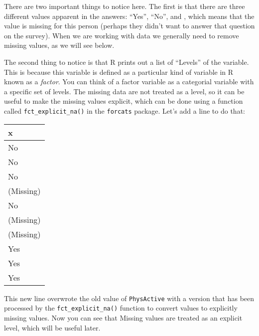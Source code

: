 \documentclass[12pt,]{book}
\newenvironment{Shaded}{\begin{snugshade}}{\end{snugshade}}
\newcommand{\CommentTok}[1]{\textcolor[rgb]{0.56,0.35,0.01}{\textit{#1}}}
\newcommand{\DataTypeTok}[1]{\textcolor[rgb]{0.13,0.29,0.53}{#1}}
\newcommand{\DecValTok}[1]{\textcolor[rgb]{0.00,0.00,0.81}{#1}}
\newcommand{\KeywordTok}[1]{\textcolor[rgb]{0.13,0.29,0.53}{\textbf{#1}}}
\newcommand{\NormalTok}[1]{#1}
\newcommand{\OperatorTok}[1]{\textcolor[rgb]{0.81,0.36,0.00}{\textbf{#1}}}
\newcommand{\StringTok}[1]{\textcolor[rgb]{0.31,0.60,0.02}{#1}}
\begin{document}
There are two important things to notice here. The first is that there are three different values apparent in the answers: ``Yes'', ``No'', and , which means that the value is missing for this person (perhaps they didn't want to answer that question on the survey). When we are working with data we generally need to remove missing values, as we will see below.

The second thing to notice is that R prints out a list of ``Levels'' of the variable. This is because this variable is defined as a particular kind of variable in R known as a \emph{factor}. You can think of a factor variable as a categorial variable with a specific set of levels. The missing data are not treated as a level, so it can be useful to make the missing values explicit, which can be done using a function called \texttt{fct\_explicit\_na()} in the \texttt{forcats} package. Let's add a line to do that:

\begin{Shaded}
\end{Shaded}

\begin{tabular}{l}
\hline
x\\
\hline
No\\
\hline
No\\
\hline
No\\
\hline
(Missing)\\
\hline
No\\
\hline
(Missing)\\
\hline
(Missing)\\
\hline
Yes\\
\hline
Yes\\
\hline
Yes\\
\hline
\end{tabular}

This new line overwrote the old value of \texttt{PhysActive} with a version that has been processed by the \texttt{fct\_explicit\_na()} function to convert values to explicitly missing values. Now you can see that Missing values are treated as an explicit level, which will be useful later.
\end{document}
